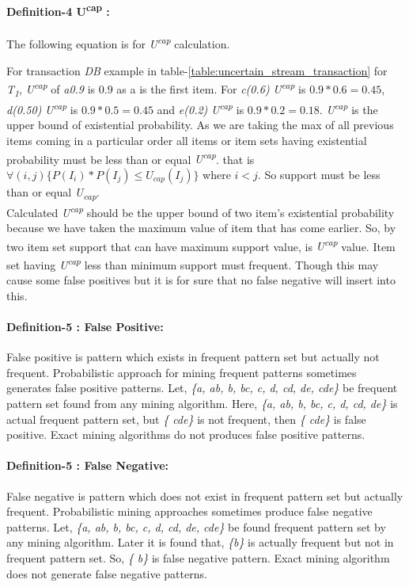 \documentclass[conference]{IEEEtran}
\begin{document}
    \paragraph{Definition-4 U\textsuperscript{cap} :}
    The following equation is for \emph{U\textsuperscript{cap}}    calculation.
    
    For transaction \emph{DB} example in table-\ref{table:uncertain_stream_transaction} for \emph{T\textsubscript{1}}, \emph{U\textsuperscript{cap}} of \emph{a{0.9}} is $0.9$ as a is the first item. For \emph{c(0.6)} \emph{U\textsuperscript{cap}} is $0.9*0.6=0.45$, \emph{d(0.50)} \emph{U\textsuperscript{cap}} is $0.9*0.5=0.45$ and \emph{e(0.2)} \emph{U\textsuperscript{cap}} is $0.9*0.2=0.18$. \emph{U\textsuperscript{cap}} is the upper bound of existential probability. As we are taking the max of all previous items coming in a particular order all items or item sets having existential probability must be less than or equal \emph{U\textsuperscript{cap}}. that is $\forall(i,j)\{ P(I_i)*P(I_j)\leq U_{cap}(I_j)\}$ where $i < j$. So support must be less than or equal \emph{U\textsubscript{cap}}.\\
    Calculated \emph{U\textsuperscript{cap}} should be the upper bound of two item's existential probability because we have taken the maximum value of item that has come earlier. So, by two item set support that can have maximum support value, is \emph{U\textsuperscript{cap}} value. Item set having \emph{U\textsuperscript{cap}} less than minimum support must frequent. Though this may cause some false positives but it is for sure that no false negative will insert into this. 
  
    \paragraph{Definition-5 : False Positive: } False positive is pattern which exists in frequent pattern set but actually not frequent. Probabilistic approach for mining frequent patterns sometimes generates false positive patterns. Let, \emph{\{a, ab, b, bc, c, d, cd, de, cde\}} be frequent pattern set found from any mining algorithm. Here, \emph{\{a, ab, b, bc, c, d, cd, de\}} is actual frequent pattern set, but \emph{\{ cde\}} is not frequent, then \emph{\{ cde\}} is false positive. Exact mining algorithms do not produces false positive patterns.
    
  \paragraph{Definition-5 : False Negative: } False negative is pattern which does not exist in frequent pattern set but actually frequent. Probabilistic mining approaches sometimes produce false negative patterns. Let, \emph{\{a, ab, b, bc, c, d, cd, de, cde\}} be found frequent pattern set by any mining algorithm. Later it is found that, \emph{\{b\}} is actually frequent but not in frequent pattern set. So, \emph{\{ b\}} is false negative pattern. Exact mining algorithm does not generate false negative patterns.
  
\end{document}
